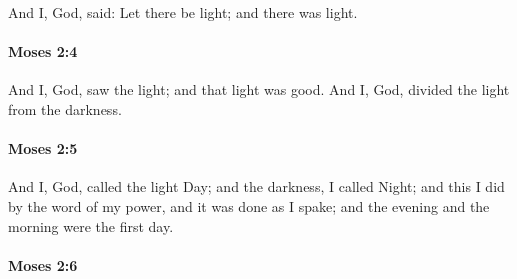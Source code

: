 			And I, God, said: Let there be light; and there was light.


		\paragraph{Moses 2:4} %
			\label{MOSES-2-4}

			And I, God, saw the light; and that light was good. And I, God, divided the light from the darkness.


		\paragraph{Moses 2:5} %
			\label{MOSES-2-5}

			And I, God, called the light Day; and the darkness, I called Night; and this I did by the word of my power, and it was done as I spake; and the evening and the morning were the first day.


		\paragraph{Moses 2:6} %
			\label{MOSES-2-6}

